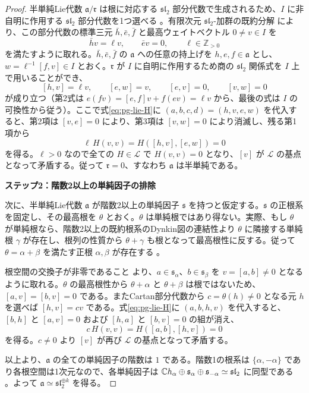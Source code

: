 \begin{proof}
半単純Lie代数 $\mathfrak a/\mathfrak r$ は根に対応する $\mathfrak{sl}_2$ 部分代数で生成されるため、$I$ に非自明に作用する $\mathfrak{sl}_2$ 部分代数を1つ選べる \cite[Lemma~19.16, Theorem~19.19(i)]{PEtingofLie}。有限次元 $\mathfrak{sl}_2$-加群の既約分解 \cite[Theorem~11.16(iii),(iv)]{PEtingofLie} により、この部分代数の標準三元 $\bar h,\bar e,\bar f$ と最高ウェイトベクトル $0\ne v\in I$ を
\begin{equation}\label{eq:pg-primitive-vector}
\bar h v=\ell v,\qquad \bar e v=0,\qquad
\ell\in\mathbb Z_{>0}
\end{equation}
を満たすように取れる。$\bar h,\bar e,\bar f$ の $\mathfrak a$ への任意の持上げを $h,e,f\in\mathfrak a$ とし、$w=\ell^{-1}[f,v]\in I$ とおく。$\mathfrak r$ が $I$ に自明に作用するため商の $\mathfrak{sl}_2$ 関係式を $I$ 上で用いることができ、
\begin{equation}\label{eq:pg-radical-witness}
[h,v]=\ell v,\qquad [e,w]=v,\qquad [e,v]=0,
\qquad [v,w]=0
\end{equation}
が成り立つ（第2式は $e(fv)=[e,f]v+f(ev)=\ell v$ から、最後の式は $I$ の可換性から従う）。ここで式\eqref{eq:pg-lie-H}に $(a,b,c,d)=(h,v,e,w)$ を代入すると、第2項は $[v,e]=0$ により、第3項は $[v,w]=0$ により消滅し、残る第1項から
\[
  \ell\,H(v,v)=H([h,v],[e,w])=0
\]
を得る。$\ell>0$ なので全ての $H\in\mathcal L$ で $H(v,v)=0$ となり、$[v]$ が $\mathcal L$ の基点となって矛盾する。従って $\mathfrak r=0$、すなわち $\mathfrak a$ は半単純である。

\par\medskip\noindent\textbf{ステップ2：階数2以上の単純因子の排除}\par\nobreak\smallskip
次に、半単純Lie代数 $\mathfrak a$ が階数2以上の単純因子 $\mathfrak s$ を持つと仮定する。$\mathfrak s$ の正根系を固定し、その最高根を $\theta$ とおく。$\theta$ は単純根ではあり得ない。実際、もし $\theta$ が単純根なら、階数2以上の既約根系のDynkin図の連結性より $\theta$ に隣接する単純根 $\gamma$ が存在し、根列の性質から $\theta+\gamma$ も根となって最高根性に反する。従って $\theta=\alpha+\beta$ を満たす正根 $\alpha,\beta$ が存在する \cite[Definition~21.13, \S32.2]{PEtingofLie}。

根空間の交換子が非零であること \cite[Theorem~19.19(iv)]{PEtingofLie} より、$a\in\mathfrak s_\alpha$、$b\in\mathfrak s_\beta$ を $v=[a,b]\ne0$ となるように取れる。$\theta$ の最高根性から $\theta+\alpha$ と $\theta+\beta$ は根ではないため、$[a,v]=[b,v]=0$ である。またCartan部分代数から $c=\theta(h)\ne0$ となる元 $h$ を選べば $[h,v]=cv$ である。式\eqref{eq:pg-lie-H}に $(a,b,h,v)$ を代入すると、$[b,h]$ と $[a,v]=0$ および $[h,a]$ と $[b,v]=0$ の組が消え、
\[
  c\,H(v,v)=H([a,b],[h,v])=0
\]
を得る。$c\ne0$ より $[v]$ が再び $\mathcal L$ の基点となって矛盾する。

以上より、$\mathfrak a$ の全ての単純因子の階数は $1$ である。階数1の根系は $\{\alpha,-\alpha\}$ であり各根空間は1次元なので、各単純因子は $\mathbb C h_\alpha\oplus\mathfrak s_\alpha\oplus\mathfrak s_{-\alpha}\simeq\mathfrak{sl}_2$ に同型である \cite[Lemma~19.16, Corollary~19.18]{PEtingofLie}。よって $\mathfrak a\simeq\mathfrak{sl}_2^{\oplus k}$ を得る。
\end{proof}

